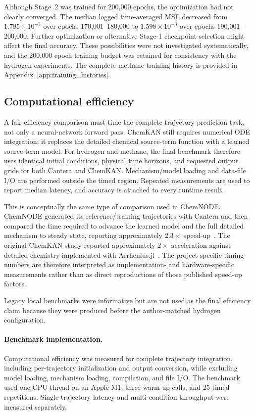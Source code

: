 \documentclass[11pt,a4paper]{article}
\begin{document}
Although Stage~2 was trained for 200,000 epochs,
the optimization had not clearly converged.
The median logged time-averaged MSE decreased
from $1.785\times10^{-3}$ over epochs
170,001--180,000 to $1.598\times10^{-3}$
over epochs 190,001--200,000. Further optimization or alternative Stage-1
checkpoint selection might affect the final
accuracy. These possibilities were not
investigated systematically, and the
200,000 epoch training budget was retained for
consistency with the hydrogen experiments. 
The complete methane training history is
provided in Appendix~\ref{app:training_histories}.



\subsection{Computational efficiency}

A fair efficiency comparison must time the complete trajectory prediction task, not only a neural-network forward pass. ChemKAN still requires numerical ODE integration; it replaces the detailed chemical source-term function with a learned source-term model. For hydrogen and methane, the final benchmark therefore uses identical initial conditions, physical time horizons, and requested output grids for both Cantera and ChemKAN. Mechanism/model loading and data-file I/O are performed outside the timed region. Repeated measurements are used to report median latency, and accuracy is attached to every runtime result.

This is conceptually the same type of comparison used in ChemNODE. ChemNODE generated its reference/training trajectories with Cantera and then compared the time required to advance the learned model and the full detailed mechanism to steady state, reporting approximately $2.3\times$ speed-up~\cite{OWOYELE2022100118}. The original ChemKAN study reported approximately $2\times$ acceleration against detailed chemistry implemented with Arrhenius.jl~\cite{Koenig_2025,ji2021arrhenius}. The project-specific timing numbers are therefore interpreted as implementation- and hardware-specific measurements rather than as direct reproductions of those published speed-up factors.

Legacy local benchmarks were informative but are not used as the final efficiency claim because they were produced before the author-matched hydrogen configuration.


\paragraph{Benchmark implementation.}
Computational efficiency was measured for complete
trajectory integration, including per-trajectory
initialization and output conversion, while excluding
model loading, mechanism loading, compilation, and file
I/O. The benchmark used one CPU thread on an Apple M1,
three warm-up calls, and 25 timed repetitions.
Single-trajectory latency and multi-condition
throughput were measured separately.
\end{document}
